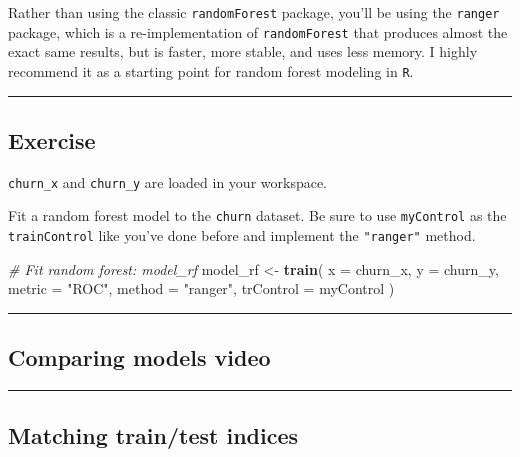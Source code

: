 \documentclass[
]{book}
\newenvironment{Shaded}{\begin{snugshade}}{\end{snugshade}}
\newcommand{\CommentTok}[1]{\textcolor[rgb]{0.56,0.35,0.01}{\textit{#1}}}
\newcommand{\DataTypeTok}[1]{\textcolor[rgb]{0.13,0.29,0.53}{#1}}
\newcommand{\KeywordTok}[1]{\textcolor[rgb]{0.13,0.29,0.53}{\textbf{#1}}}
\newcommand{\NormalTok}[1]{#1}
\newcommand{\StringTok}[1]{\textcolor[rgb]{0.31,0.60,0.02}{#1}}
\begin{document}
Rather than using the classic \texttt{randomForest} package, you'll be using the \texttt{ranger} package, which is a re-implementation of \texttt{randomForest} that produces almost the exact same results, but is faster, more stable, and uses less memory. I highly recommend it as a starting point for random forest modeling in \texttt{R}.

\begin{center}\rule{0.5\linewidth}{0.5pt}\end{center}

\hypertarget{exercise-31}{%
\subsection*{Exercise}\label{exercise-31}}

\texttt{churn\_x} and \texttt{churn\_y} are loaded in your workspace.

Fit a random forest model to the \texttt{churn} dataset. Be sure to use \texttt{myControl} as the \texttt{trainControl} like you've done before and implement the \texttt{"ranger"} method.

\begin{Shaded}
\begin{Highlighting}[]
\CommentTok{# Fit random forest: model_rf}
\NormalTok{model_rf <-}\StringTok{ }\KeywordTok{train}\NormalTok{(}
  \DataTypeTok{x =}\NormalTok{ churn_x, }\DataTypeTok{y =}\NormalTok{ churn_y,}
  \DataTypeTok{metric =} \StringTok{"ROC"}\NormalTok{,}
  \DataTypeTok{method =} \StringTok{"ranger"}\NormalTok{,}
  \DataTypeTok{trControl =}\NormalTok{ myControl}
\NormalTok{)}
\end{Highlighting}
\end{Shaded}

\begin{center}\rule{0.5\linewidth}{0.5pt}\end{center}

\hypertarget{comparing-models-video}{%
\subsection*{Comparing models video}\label{comparing-models-video}}

\begin{center}\rule{0.5\linewidth}{0.5pt}\end{center}

\hypertarget{matching-traintest-indices}{%
\subsection*{Matching train/test indices}\label{matching-traintest-indices}}
\end{document}
